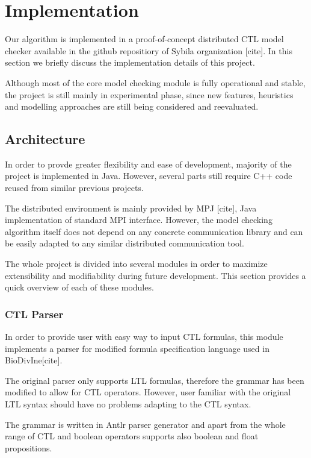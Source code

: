 \documentclass[12pt,oneside,draft]{fithesis2}
\begin{document}
	\chapter{Implementation}

		Our algorithm is implemented in a proof-of-concept distributed CTL model checker available in the github repositiory of Sybila organization [cite]. In this section we briefly discuss the implementation details of this project. 
		
		Although most of the core model checking module is fully operational and stable, the project is still mainly in experimental phase, since new features, heuristics and modelling approaches are still being considered and reevaluated.

		\section{Architecture}
		
			In order to provde greater flexibility and ease of development, majority of the project is implemented in Java. However, several parts still require C++ code reused from similar previous projects. 
			
			The distributed environment is mainly provided by MPJ [cite], Java implementation of standard MPI interface. However, the model checking algorithm itself does not depend on any concrete communication library and can be easily adapted to any similar distributed communication tool.
			
			The whole project is divided into several modules in order to maximize extensibility and modifiability during future development. This section provides a quick overview of each of these modules.
			
			\subsection{CTL Parser}
			
				In order to provide user with easy way to input CTL formulas, this module implements a parser for modified formula specification language used in BioDivIne[cite]. 
				
				The original parser only supports LTL formulas, therefore the grammar has been modified to allow for CTL operators. However, user familiar with the original LTL syntax should have no problems adapting to the CTL syntax.
				
				The grammar is written in Antlr parser generator and apart from the whole range of CTL and boolean operators supports also boolean and float propositions.
				
\end{document}
